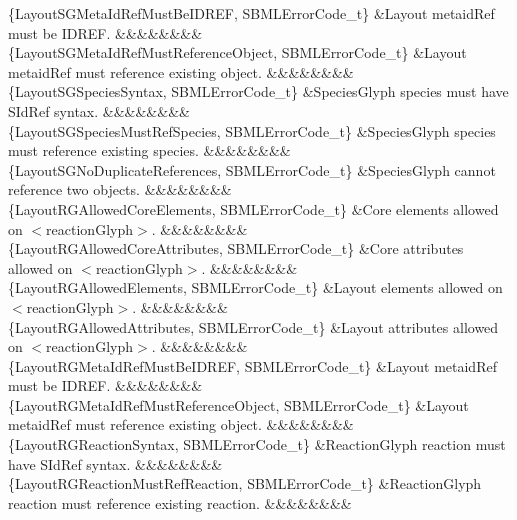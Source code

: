 \begin{DoxyParagraph}{}
\begin{longtabu}
\{Layout\+S\+G\+Meta\+Id\+Ref\+Must\+Be\+I\+D\+R\+EF, S\+B\+M\+L\+Error\+Code\+\_\+t\} &Layout \textquotesingle{}metaid\+Ref\textquotesingle{} must be I\+D\+R\+EF. &&&&&&&&\\
\{Layout\+S\+G\+Meta\+Id\+Ref\+Must\+Reference\+Object, S\+B\+M\+L\+Error\+Code\+\_\+t\} &Layout \textquotesingle{}metaid\+Ref\textquotesingle{} must reference existing object. &&&&&&&&\\
\{Layout\+S\+G\+Species\+Syntax, S\+B\+M\+L\+Error\+Code\+\_\+t\} &Species\+Glyph \textquotesingle{}species\textquotesingle{} must have S\+Id\+Ref syntax. &&&&&&&&\\
\{Layout\+S\+G\+Species\+Must\+Ref\+Species, S\+B\+M\+L\+Error\+Code\+\_\+t\} &Species\+Glyph species must reference existing species. &&&&&&&&\\
\{Layout\+S\+G\+No\+Duplicate\+References, S\+B\+M\+L\+Error\+Code\+\_\+t\} &Species\+Glyph cannot reference two objects. &&&&&&&&\\
\{Layout\+R\+G\+Allowed\+Core\+Elements, S\+B\+M\+L\+Error\+Code\+\_\+t\} &Core elements allowed on {\ttfamily $<$reaction\+Glyph$>$}. &&&&&&&&\\
\{Layout\+R\+G\+Allowed\+Core\+Attributes, S\+B\+M\+L\+Error\+Code\+\_\+t\} &Core attributes allowed on {\ttfamily $<$reaction\+Glyph$>$}. &&&&&&&&\\
\{Layout\+R\+G\+Allowed\+Elements, S\+B\+M\+L\+Error\+Code\+\_\+t\} &Layout elements allowed on {\ttfamily $<$reaction\+Glyph$>$}. &&&&&&&&\\
\{Layout\+R\+G\+Allowed\+Attributes, S\+B\+M\+L\+Error\+Code\+\_\+t\} &Layout attributes allowed on {\ttfamily $<$reaction\+Glyph$>$}. &&&&&&&&\\
\{Layout\+R\+G\+Meta\+Id\+Ref\+Must\+Be\+I\+D\+R\+EF, S\+B\+M\+L\+Error\+Code\+\_\+t\} &Layout \textquotesingle{}metaid\+Ref\textquotesingle{} must be I\+D\+R\+EF. &&&&&&&&\\
\{Layout\+R\+G\+Meta\+Id\+Ref\+Must\+Reference\+Object, S\+B\+M\+L\+Error\+Code\+\_\+t\} &Layout \textquotesingle{}metaid\+Ref\textquotesingle{} must reference existing object. &&&&&&&&\\
\{Layout\+R\+G\+Reaction\+Syntax, S\+B\+M\+L\+Error\+Code\+\_\+t\} &Reaction\+Glyph \textquotesingle{}reaction\textquotesingle{} must have S\+Id\+Ref syntax. &&&&&&&&\\
\{Layout\+R\+G\+Reaction\+Must\+Ref\+Reaction, S\+B\+M\+L\+Error\+Code\+\_\+t\} &Reaction\+Glyph reaction must reference existing reaction. &&&&&&&&\\

\end{longtabu}
\end{DoxyParagraph}
